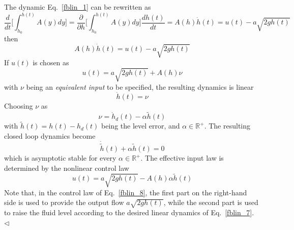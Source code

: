 \documentclass[12pt,a4paper,oneside]{book}
\begin{document}
\begin{onehalfspace}
\begin{itemize}
{\begin{example}
			The dynamic Eq.~\ref{fblin_1} can be rewritten as 
			\begin{equation}\label{fblin_2}
				\frac{d}{dt}\Big[\int_{h_0}^{h(t)}A(y)dy\Big] = 
				\frac{\partial}{\partial 
					h}\Big[\int_{h_0}^{h(t)}A(y)dy\Big]\frac{dh(t)}{dt} = 
				A(h)\dot{h}(t)=u(t)-a\sqrt{2gh(t)}
			\end{equation}
			then
			\begin{equation}\label{fblin_3}
				A(h)\dot{h}(t)=u(t)-a\sqrt{2gh(t)}
			\end{equation}
			If $u(t)$ is chosen as 
			\begin{equation}\label{fblin_4}
				u(t) = a\sqrt{2gh(t)} + A(h)\nu
			\end{equation}
			with $\nu$ being an \textit{equivalent input} to be specified, the 
			resulting dynamics is linear
			\begin{equation}\label{fblin_5}
				\dot{h}(t) = \nu
			\end{equation}
			Choosing $\nu$ as
			\begin{equation}\label{fblin_6}
				\nu=\dot{h}_d(t) - \alpha\tilde{h}(t)
			\end{equation}
			with $\tilde{h}(t) = h(t)-h_d(t)$ being the level error, and 
			$\alpha\in\mathbb{R}^+$. The resulting closed loop dynamics become 
			\begin{equation}\label{fblin_7}
				\dot{\tilde{h}}(t) + \alpha\tilde{h}(t)=0
			\end{equation}
			which is asymptotic stable for every $\alpha\in\mathbb{R}^+$. The 
			effective input law is determined by the nonlinear control law
			\begin{equation}\label{fblin_8}
				u(t) = a\sqrt{2gh(t)} - A(h)\alpha\tilde{h}(t)
			\end{equation}
			Note that, in the control law of Eq.~\ref{fblin_8}, the first part 
			on the right-hand side is used to provide the output flow 
			$a\sqrt{2gh(t)}$, while the second part is used to raise the fluid 
			level according to the desired linear dynamics of Eq.~\ref{fblin_7}.
			$\triangleleft$ 
		\end{example}  
	}
\end{itemize}


\end{onehalfspace}
\end{document}

